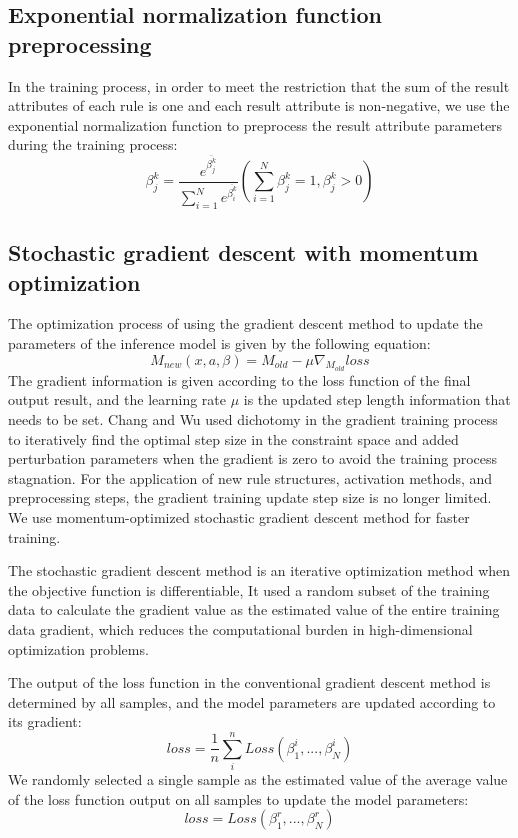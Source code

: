 \documentclass{ieeeaccess}
\begin{document}
\subsection{Exponential normalization function preprocessing}
In the training process, in order to meet the restriction that the sum of the result attributes of each rule is one and each result attribute is non-negative,
we use the exponential normalization function to preprocess the result attribute parameters during the training process:
$$\beta_j^k=\frac{e^{\overline{\beta_j^k}}}{\sum_{i=1}^Ne^{\overline{\beta_i^k}}}(\sum_{i=1}^N\beta_j^k=1,\beta_j^k>0)$$

\subsection{Stochastic gradient descent with momentum optimization}
The optimization process of using the gradient descent method to update the parameters of the inference model is given by the following equation:
$$M_{new}(x,a,\beta)=M_{old}-\mu\nabla_{M_{old}}loss$$
The gradient information is given according to the loss function of the final output result, and the learning rate $\mu$ is the updated step length information that needs to be set.
Chang\cite{a11} and Wu\cite{a13} used dichotomy in the gradient training process to iteratively find the optimal step size in the constraint space and added perturbation parameters when the gradient is zero to avoid the training process stagnation.
For the application of new rule structures, activation methods, and preprocessing steps, the gradient training update step size is no longer limited.
We use momentum-optimized stochastic gradient descent method for faster training.

The stochastic gradient descent method is an iterative optimization method when the objective function is differentiable,
It used a random subset of the training data to calculate the gradient value as the estimated value of the entire training data gradient,
which reduces the computational burden in high-dimensional optimization problems.

The output of the loss function in the conventional gradient descent method is determined by all samples,
and the model parameters are updated according to its gradient:
$$loss=\frac{1}{n}\sum_i^nLoss(\beta_1^i,...,\beta_N^i)$$
We randomly selected a single sample as the estimated value of the average value of the loss function output on all samples to update the model parameters:
$$loss=Loss(\beta_1^r,...,\beta_N^r)$$
\end{document}
